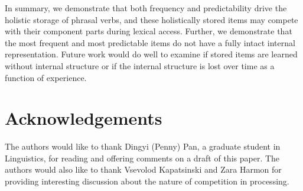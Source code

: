 \documentclass[
  authoryear,
  preprint,
  1p,
  onecolumn]{elsarticle}
\begin{document}
In summary, we demonstrate that both frequency and predictability drive
the holistic storage of phrasal verbs, and these holistically stored
items may compete with their component parts during lexical access.
Further, we demonstrate that the most frequent and most predictable
items do not have a fully intact internal representation. Future work
would do well to examine if stored items are learned without internal
structure or if the internal structure is lost over time as a function
of experience.

\section{Acknowledgements}\label{acknowledgements}

The authors would like to thank Dingyi (Penny) Pan, a graduate student
in Linguistics, for reading and offering comments on a draft of this
paper. The authors would also like to thank Vsevolod Kapatsinski and
Zara Harmon for providing interesting discussion about the nature of
competition in processing.


  
\end{document}
